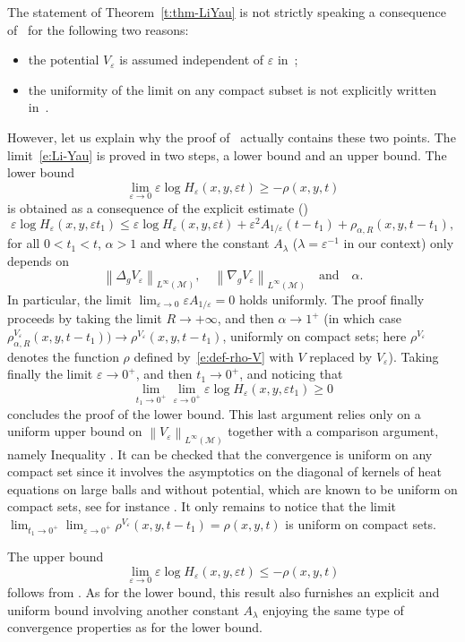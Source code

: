 \documentclass[JEP,XML,SOM,Unicode]{cedram}
\theoremstyle{definition}
\newcommand{\M}{\ensuremath{\mathcal M}}
\newcommand\nor[2]{\left\|#1\right\|_{#2}}
\let\e\varepsilon
\let\eps\varepsilon
\begin{document}
The statement of Theorem~\ref{t:thm-LiYau} is not strictly speaking a consequence of~\cite[Th.\,6.1]{LY86} for the following two reasons:
\begin{itemize}
\item the potential $V_\eps$ is assumed independent of $\eps$ in~\cite{LY86};
\item the uniformity of the limit on any compact subset is not explicitly written in~\cite{LY86}.
\end{itemize}
However, let us explain why the proof of~\cite[Th.\,6.1]{LY86} actually contains these two points.
The limit~\eqref{e:Li-Yau} is proved in two steps, a lower bound and an upper bound.
The lower bound
\[
\underset{\e\to 0}{\lim}\e \log H_{\e}(x,y,\e t) \geq -\rho(x,y,t)
\]
is obtained as a consequence of the explicit estimate (\cite[Th.\,2.1]{LY86})
\[
\e \log H_{\e}(x,y,\e t_1) \leq \e \log H_{\e}(x,y,\e t)
+ \eps^2 A_{1/\eps} (t-t_1) + \rho_{\alpha,R}(x,y,t-t_1),
\]
for all $0<t_1<t$, $\alpha>1$ and
where the constant $A_{\lambda}$ ($\lambda=\e^{-1}$ in our context) only depends on
\[
\nor{\Delta_g V_\eps}{L^\infty(\M)},\quad \nor{\nabla_g V_\eps}{L^\infty(\M)}\quad\text{and}\quad\alpha.
\]
In particular, the limit $\lim_{\eps\to 0} \eps A_{1/\eps} = 0$ holds uniformly.
The proof finally proceeds by taking the limit $R\to + \infty$, and then $\alpha \to 1^+$ (in which case $\rho^{V_\eps}_{\alpha,R}(x,y,t-t_1)) \to \rho^{V_\eps}(x,y,t-t_1)$, uniformly on compact sets; here $\rho^{V_\eps}$ denotes the function $\rho$ defined by~\eqref{e:def-rho-V} with $V$ replaced by $V_\eps$). Taking finally the limit $\eps \to 0^+$, and then $t_1 \to 0^+$, and noticing that\enlargethispage{-\baselineskip}
\[
\lim_{t_1\to 0^+}\lim_{\eps \to 0^+} \e \log H_{\e}(x,y,\e t_1) \geq 0
\]
concludes the proof of the lower bound.
This last argument relies only on a uniform upper bound on $\nor{V_\eps}{L^\infty(\M)}$ together with a comparison argument, namely Inequa\-lity \cite[(6.3)]{LY86}. It can be checked that the convergence is uniform on any compact set since it involves the asymptotics on the diagonal of kernels of heat equations on large balls and without potential, which are known to be uniform on compact sets, see for instance \cite[Th.\,4.6]{Va:67b}.
It only remains to notice that the limit $\lim_{t_1\to 0^+} \lim_{\eps \to 0^+} \rho^{V_\eps}(x,y,t-t_1) = \rho(x,y, t)$ is uniform on compact sets.

The upper bound
\[
\underset{\e\to 0}{\lim}\e \log H_{\e}(x,y,\e t) \leq -\rho(x,y,t)
\]
follows from \cite[Th.\,3.3]{LY86}. As for the lower bound, this result also furnishes an explicit and uniform bound involving another constant $A_{\lambda}$ enjoying the same type of convergence properties as for the lower bound.
\end{document}
